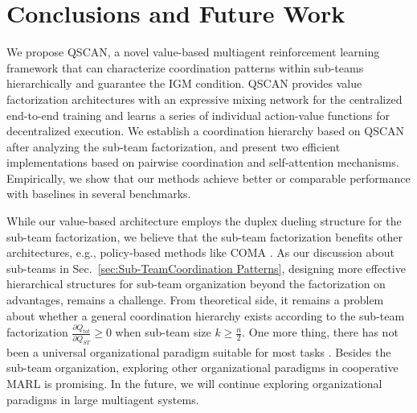 
\section{Conclusions and Future Work}

We propose QSCAN, a novel value-based multiagent reinforcement learning framework that can
characterize coordination patterns within sub-teams hierarchically and guarantee the IGM condition. QSCAN provides value factorization architectures with an expressive mixing network for the
centralized end-to-end training and learns a series of individual action-value functions for decentralized execution. We establish a coordination hierarchy based on QSCAN after analyzing the
sub-team factorization, and present two efficient implementations based on pairwise coordination
and self-attention mechanisms. Empirically, we show that our methods achieve better or comparable
performance with baselines in several benchmarks.

While our value-based architecture employs the duplex dueling structure for the sub-team factorization,
we believe that the sub-team factorization benefits other architectures, e.g., policy-based methods
like COMA \cite{r5}. As our discussion about sub-teams in Sec.~\ref{sec:Sub-TeamCoordination Patterns}, designing more effective hierarchical
structures for sub-team organization beyond the factorization on advantages, remains a challenge.
From theoretical side, it remains a problem about whether a general coordination hierarchy exists
according to the sub-team factorization $\frac{\partial Q_{tot}}{\partial Q_{ST}} \geq 0$ when sub-team size $k \geq \frac{n}{2}$. One more thing,
there has not been a universal organizational paradigm suitable for most tasks \cite{r9,r3}. Besides the
sub-team organization, exploring other organizational paradigms in cooperative MARL is promising.
In the future, we will continue exploring organizational paradigms in large multiagent systems.
    
